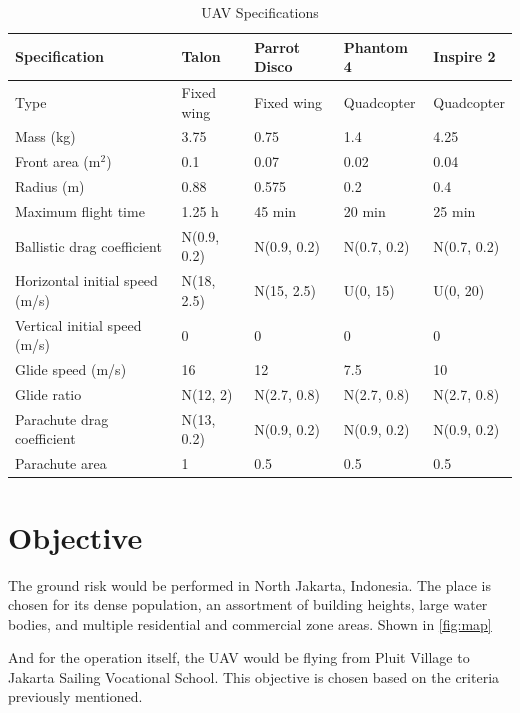\documentclass[12pt]{report}
\begin{document}
        \begin{table}[H]
            \centering
            \begin{tabular}{| l | l | l | l | l |}
                \hline
                \textbf{Specification} & \textbf{Talon} & \textbf{Parrot Disco} & \textbf{Phantom 4} & \textbf{Inspire 2} \\
                \hline
                Type & Fixed wing & Fixed wing & Quadcopter & Quadcopter \\
                Mass (kg) & 3.75 & 0.75 & 1.4 & 4.25 \\
                Front area (m$^2$) & 0.1 & 0.07 & 0.02 & 0.04 \\
                Radius (m) & 0.88 & 0.575 & 0.2 & 0.4 \\
                Maximum flight time & 1.25 h & 45 min & 20 min & 25 min \\
                Ballistic drag coefficient & N(0.9, 0.2) & N(0.9, 0.2) & N(0.7, 0.2) & N(0.7, 0.2) \\
                Horizontal initial speed (m/s) & N(18, 2.5) & N(15, 2.5) & U(0, 15) & U(0, 20) \\
                Vertical initial speed (m/s) & 0 & 0 & 0 & 0 \\
                Glide speed (m/s) & 16 & 12 & 7.5 & 10 \\
                Glide ratio & N(12, 2) & N(2.7, 0.8) & N(2.7, 0.8) & N(2.7, 0.8) \\
                Parachute drag coefficient & N(13, 0.2) & N(0.9, 0.2) & N(0.9, 0.2) & N(0.9, 0.2) \\
                Parachute area & 1 & 0.5 & 0.5 & 0.5 \\
                \hline
            \end{tabular}
            \caption{UAV Specifications}  %
        \end{table}

    \section{Objective}
    The ground risk would be performed in North Jakarta, Indonesia. The place is chosen for its dense population, an
    assortment of building heights, large water bodies, and multiple residential and commercial zone areas. Shown in \ref{fig:map}
        
    And for the operation itself, the UAV would be flying from Pluit Village to Jakarta Sailing Vocational School. This
    objective is chosen based on the criteria previously mentioned.
        
\end{document}
